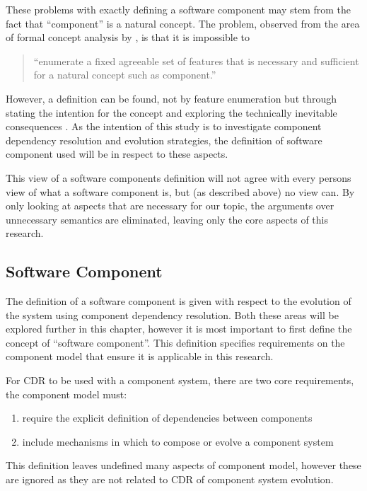 These problems with exactly defining a software component may stem from the fact that ``component'' is a natural concept.
The problem, observed from the area of formal concept analysis \cite{Ganter1999} by \cite{Szyperski2002}, is that it is impossible to

\begin{quotation} 
``enumerate a fixed agreeable set of features that is necessary and sufficient for a natural concept such as component.'' 
\end{quotation}

However, a definition can be found, not by feature enumeration but through stating the intention for the concept and exploring the technically inevitable consequences \cite{Szyperski2002}. 
As the intention of this study is to investigate component dependency resolution and evolution strategies,
the definition of software component used will be in respect to these aspects.

This view of a software components definition will not agree with every persons view of what a software component is, but (as described above) no view can.
By only looking at aspects that are necessary for our topic, the arguments over unnecessary semantics are eliminated, leaving only the core aspects of this research. 

\subsection{Software Component}
The definition of a software component is given with respect to the evolution of the system using component dependency resolution.
Both these areas will be explored further in this chapter, however it is most important to first define the concept of ``software component''.
This definition specifies requirements on the component model that ensure it is applicable in this research.

For CDR to be used with a component system, there are two core requirements, the component model must:
\begin{enumerate}
  \item require the explicit definition of dependencies between components
  \item include mechanisms in which to compose or evolve a component system
\end{enumerate}
This definition leaves undefined many aspects of component model, however these are ignored as they are not related to CDR of component system evolution.

